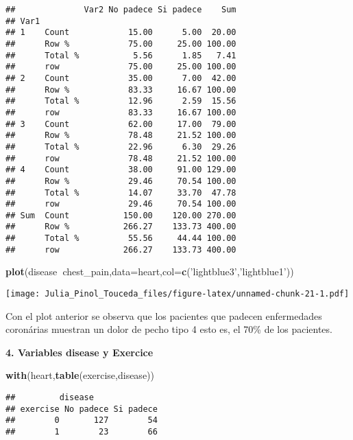 \documentclass[]{article}
\newenvironment{Shaded}{\begin{snugshade}}{\end{snugshade}}
\newcommand{\KeywordTok}[1]{\textcolor[rgb]{0.13,0.29,0.53}{\textbf{#1}}}
\newcommand{\DataTypeTok}[1]{\textcolor[rgb]{0.13,0.29,0.53}{#1}}
\newcommand{\StringTok}[1]{\textcolor[rgb]{0.31,0.60,0.02}{#1}}
\newcommand{\OperatorTok}[1]{\textcolor[rgb]{0.81,0.36,0.00}{\textbf{#1}}}
\newcommand{\NormalTok}[1]{#1}
\begin{document}
\begin{verbatim}
##              Var2 No padece Si padece    Sum
## Var1                                        
## 1    Count            15.00      5.00  20.00
##      Row %            75.00     25.00 100.00
##      Total %           5.56      1.85   7.41
##      row              75.00     25.00 100.00
## 2    Count            35.00      7.00  42.00
##      Row %            83.33     16.67 100.00
##      Total %          12.96      2.59  15.56
##      row              83.33     16.67 100.00
## 3    Count            62.00     17.00  79.00
##      Row %            78.48     21.52 100.00
##      Total %          22.96      6.30  29.26
##      row              78.48     21.52 100.00
## 4    Count            38.00     91.00 129.00
##      Row %            29.46     70.54 100.00
##      Total %          14.07     33.70  47.78
##      row              29.46     70.54 100.00
## Sum  Count           150.00    120.00 270.00
##      Row %           266.27    133.73 400.00
##      Total %          55.56     44.44 100.00
##      row             266.27    133.73 400.00
\end{verbatim}

\begin{Shaded}
\begin{Highlighting}[]
\KeywordTok{plot}\NormalTok{(disease}\OperatorTok{~}\NormalTok{chest_pain,}\DataTypeTok{data=}\NormalTok{heart,}\DataTypeTok{col=}\KeywordTok{c}\NormalTok{(}\StringTok{'lightblue3'}\NormalTok{,}\StringTok{'lightblue1'}\NormalTok{))}
\end{Highlighting}
\end{Shaded}

\texttt{[image: Julia\_Pinol\_Touceda\_files/figure-latex/unnamed-chunk-21-1.pdf]}

Con el plot anterior se observa que los pacientes que padecen
enfermedades coronárias muestran un dolor de pecho tipo 4 esto es, el
70\% de los pacientes.

\textbf{4. Variables disease y Exercice}

\begin{Shaded}
\begin{Highlighting}[]
\KeywordTok{with}\NormalTok{(heart,}\KeywordTok{table}\NormalTok{(exercise,disease)) }
\end{Highlighting}
\end{Shaded}

\begin{verbatim}
##         disease
## exercise No padece Si padece
##        0       127        54
##        1        23        66
\end{verbatim}
\end{document}
